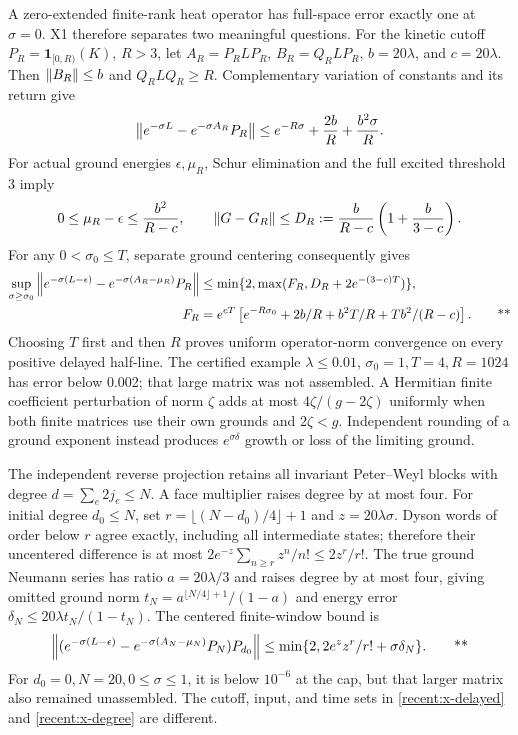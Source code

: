 A zero-extended finite-rank heat operator has full-space error exactly one at
$\sigma=0$.  X1 therefore separates two meaningful questions.  For the kinetic
cutoff $P_R=\mathbf1_{[0,R)}(K)$, $R>3$, let $A_R=P_RLP_R$,
$B_R=Q_RLP_R$, $b=20\lambda$, and $c=20\lambda$.
Then $\left\lVert B_R\right\rVert\le b$ and $Q_RLQ_R\ge R$.  Complementary variation of constants
and its return give
\begin{equation}
 \left\lVert e^{-\sigma L}-e^{-\sigma A_R}P_R\right\rVert
 \le e^{-R\sigma}+\frac{2b}{R}+\frac{b^2\sigma}{R}.
 \label{recent:x-cutoff}
\end{equation}
For actual ground energies $\epsilon,\mu_R$, Schur elimination and the full
excited threshold 3 imply
\begin{equation}
 0\le\mu_R-\epsilon\le\frac{b^2}{R-c},\qquad
 \left\lVert G-G_R\right\rVert\le D_R:=\frac{b}{R-c}\left(1+\frac b{3-c}\right).
 \label{recent:x-cutoff-ground}
\end{equation}
For any $0<\sigma_0\le T$, separate ground centering consequently gives
\begin{align}
 \sup_{\sigma\ge\sigma_0}
 \left\lVert e^{-\sigma(L-\epsilon)}-e^{-\sigma(A_R-\mu_R)}P_R\right\rVert
 &\le\min\{2,\max(F_R,D_R+2e^{-(3-c)T})\},\notag\\
 F_R&=e^{cT}\left[e^{-R\sigma_0}+2b/R+b^2T/R+Tb^2/(R-c)\right].
 \qquad\text{**}
 \label{recent:x-delayed}
\end{align}
Choosing $T$ first and then $R$ proves uniform operator-norm convergence on every
positive delayed half-line.  The certified example $\lambda\le0.01$,
$\sigma_0=1,T=4,R=1024$ has error below 0.002; that large matrix was not assembled.
A Hermitian finite coefficient perturbation of norm $\zeta$ adds at most
$4\zeta/(g-2\zeta)$ uniformly when both finite matrices use their own grounds
and $2\zeta<g$.  Independent rounding of a ground exponent instead produces
$e^{\sigma\delta}$ growth or loss of the limiting ground.

The independent reverse projection retains all invariant Peter--Weyl blocks
with degree $d=\sum_e2j_e\le N$.  A face multiplier raises degree by at most four.
For initial degree $d_0\le N$, set $r=\lfloor(N-d_0)/4\rfloor+1$ and
$z=20\lambda\sigma$.  Dyson words of order below $r$ agree exactly, including
all intermediate states; therefore their uncentered difference is at most
$2e^{-z}\sum_{n\ge r}z^n/n!\le2z^r/r!$.
The true ground Neumann series has ratio $a=20\lambda/3$ and raises degree by at
most four, giving omitted ground norm
$t_N=a^{\lfloor N/4\rfloor+1}/(1-a)$ and energy error
$\delta_N\le20\lambda t_N/(1-t_N)$.  The centered finite-window bound is
\begin{equation}
 \left\lVert (e^{-\sigma(L-\epsilon)}-e^{-\sigma(A_N-\mu_N)}P_N)P_{d_0}\right\rVert
 \le\min\{2,2e^z z^r/r!+\sigma\delta_N\}.\qquad\text{**}
 \label{recent:x-degree}
\end{equation}
For $d_0=0,N=20,0\le\sigma\le1$, it is below $10^{-6}$ at the cap, but that
larger matrix also remained unassembled.  The cutoff, input, and time sets in
\eqref{recent:x-delayed} and \eqref{recent:x-degree} are different.

